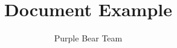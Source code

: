 \documentclass{article}
\title{Document Example}
\author{Purple Bear Team}
\begin{document}
\makecover
\maketitle
\end{document}
